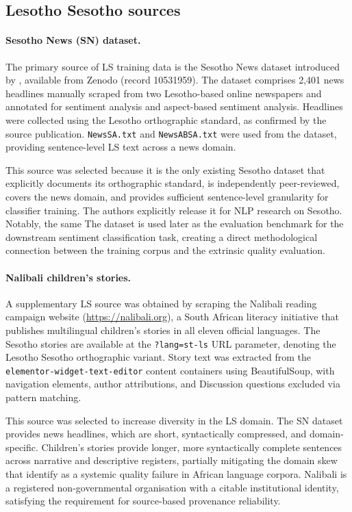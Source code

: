 \documentclass[12pt]{ThesisRU}
\begin{document}
\subsection{Lesotho Sesotho sources}

\paragraph{Sesotho News (SN) dataset.}
The primary source of LS training data is the Sesotho News dataset introduced
by \citet{mokhosi2024sesotho}, available from Zenodo (record 10531959). The
dataset comprises 2,401 news headlines manually scraped from two Lesotho-based
online newspapers and annotated for sentiment analysis and aspect-based sentiment
analysis. Headlines were collected using the Lesotho orthographic standard, as
confirmed by the source publication. \texttt{NewsSA.txt} and \texttt{NewsABSA.txt} were used from the dataset, providing sentence-level LS text
across a news domain.

This source was selected because it is the only existing Sesotho dataset that
explicitly documents its orthographic standard, is independently peer-reviewed,
covers the news domain, and provides sufficient sentence-level granularity for
classifier training. The authors explicitly release it for NLP research on Sesotho. Notably, the same
The dataset is used later as the evaluation benchmark for the downstream sentiment
classification task, creating a direct methodological connection between the
training corpus and the extrinsic quality evaluation.

\paragraph{Nalibali children's stories.}
A supplementary LS source was obtained by scraping the Nalibali reading
campaign website (\url{https://nalibali.org}), a South African literacy
initiative that publishes multilingual children's stories in all eleven official
languages. The Sesotho stories are available at the \texttt{?lang=st-ls} URL
parameter, denoting the Lesotho Sesotho orthographic variant. Story text was
extracted from the \texttt{elementor-widget-text-editor} content containers
using BeautifulSoup, with navigation elements, author attributions, and
Discussion questions excluded via pattern matching.

This source was selected to increase diversity in the LS domain. The SN dataset
provides news headlines, which are short, syntactically compressed, and
domain-specific. Children's stories provide longer, more syntactically complete
sentences across narrative and descriptive registers, partially mitigating the
domain skew that \citet{kwon2026afroscope} identify as a systemic quality
failure in African language corpora. Nalibali is a registered non-governmental
organisation with a citable institutional identity, satisfying the requirement
for source-based provenance reliability.
\end{document}
